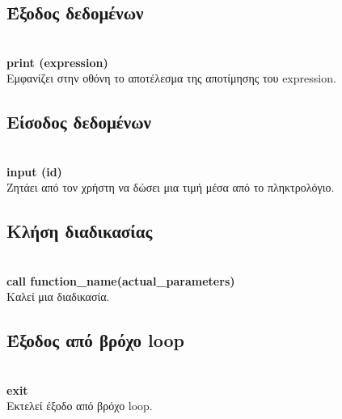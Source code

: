 \documentclass[12pt,a4paper,a4paper]{report}
\begin{document}
 \subsection{Έξοδος δεδομένων}
   \hspace{10mm}\\
\textbf{print (expression)}\\
Εμφανίζει στην οθόνη το αποτέλεσμα της αποτίμησης του expression.\\
 \subsection{Eίσοδος δεδομένων}
   \hspace{10mm}\\
\textbf{input (id)}\\
Ζητάει από τον χρήστη να δώσει μια τιμή μέσα από το πληκτρολόγιο.\\
 \subsection{Κλήση διαδικασίας}
   \hspace{10mm}\\
\textbf{call function\_name(actual\_parameters)}\\
Καλεί μια διαδικασία.\\
 \subsection{Έξοδος από βρόχο loop}
   \hspace{10mm}\\
\textbf{exit}\\
Εκτελεί έξοδο από βρόχο loop.\\

\newpage
\end{document}
